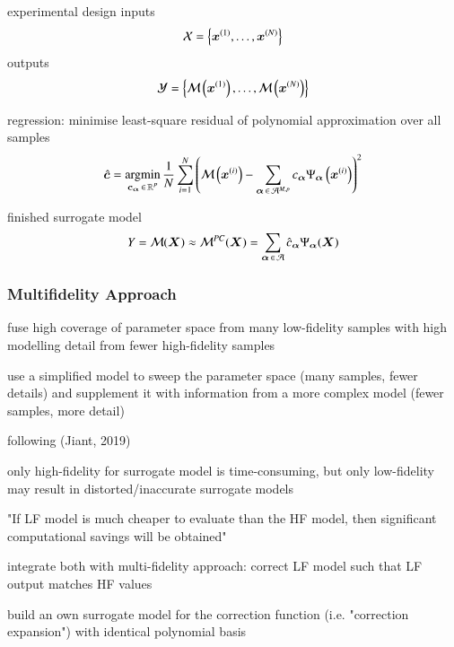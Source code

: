 experimental design
inputs
\begin{equation}
    \mathcal{X} = \left\{ \bm x^{(1)},\dots,\bm x^{(N)} \right\}
\end{equation}
outputs
\begin{equation}
    \mathcal{Y} = \left\{ \mathcal{M}\left(\bm x^{(1)}\right),\dots,\mathcal{M}\left(\bm x^{(N)}\right) \right\}
\end{equation}

regression: minimise least-square residual of polynomial approximation over all samples
\begin{equation}
    \hat{\bm{c}} = \operatorname*{\arg\!\min}_{\bm{c}_{\bm{\alpha}} \,\in\, \mathbb{R}^P} \frac{1}{N} \sum_{i=1}^N \left(
        \mathcal{M} \left(\bm x^{(i)}\right) - \sum_{{\bm{\alpha}} \,\in\, \mathcal{A}^{M,p}} c_{\bm{\alpha}} \Psi_{\bm{\alpha}}\left(\bm x^{(i)}\right)
    \right)^2
\end{equation}

finished surrogate model
\begin{equation}
    Y = \mathcal{M}(\bm X) \approx \mathcal{M}^{PC}(\bm X) = \sum_{{\bm{\alpha}} \,\in\, \mathcal{A}} \hat{c}_{\bm{\alpha}} \Psi_{\bm{\alpha}} (\bm X)
\end{equation}

\subsubsection{Multifidelity Approach}

\cite{palar_multi-fidelity_2016}
\cite{ng_multifidelity_2012}
\cite{berchier_multi-fidelity_nodate}

fuse high coverage of parameter space from many low-fidelity samples with
high modelling detail from fewer high-fidelity samples

use a simplified model to sweep the parameter space (many samples, fewer details)
and supplement it with information from a more complex model (fewer samples, more detail)

following (Jiant, 2019)

only high-fidelity for surrogate model is time-consuming,
but only low-fidelity may result in distorted/inaccurate surrogate models

"If LF model is much cheaper to evaluate than the HF model, then significant
computational savings will be obtained" \cite{ng_multifidelity_2012}

integrate both with multi-fidelity approach: correct LF model such that LF output matches HF values

build an own surrogate model for the correction function (i.e. "correction expansion") with identical polynomial basis


